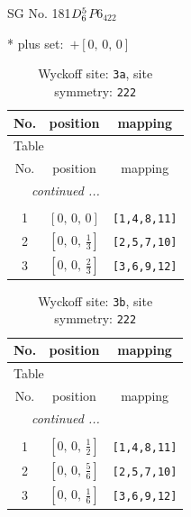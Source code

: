 \documentclass[fleqn,8pt]{jsarticle}
\begin{document}
\setcounter{MaxMatrixCols}{32}

\renewcommand{\tablename}{Table~}
\renewcommand{\figurename}{Figure~}
\begin{center}
\LARGE
SG No. 181\quad$D_{\rm 6}^{5}$\quad$P6_422$\quad[ hexagonal ]
\end{center}
* plus set:\,\,\,$+\left[ 0,\, 0,\, 0 \right]$
\renewcommand{\arraystretch}{1.2}
\begin{longtable}{ccc}
\caption{Wyckoff site: {\tt 3a}, site symmetry: {\tt 222}}
 \\
 \hline \hline
No. & position & mapping \\ \hline \endfirsthead

\multicolumn{2}{l}{\tablename\ \thetable{}} \\
 \hline \hline
No. & position & mapping \\ \hline \endhead

 \hline \hline
\multicolumn{2}{r}{\footnotesize\it continued ...} \\ \endfoot

 \hline \hline
\multicolumn{2}{r}{} \\ \endlastfoot

1 & $\left[ 0,\, 0,\, 0 \right]$ & {\tt [1,4,8,11]} \\ \hline
2 & $\left[ 0,\, 0,\, \frac{1}{3} \right]$ & {\tt [2,5,7,10]} \\ \hline
3 & $\left[ 0,\, 0,\, \frac{2}{3} \right]$ & {\tt [3,6,9,12]} \\
\end{longtable}
\renewcommand{\arraystretch}{1.2}
\begin{longtable}{ccc}
\caption{Wyckoff site: {\tt 3b}, site symmetry: {\tt 222}}
 \\
 \hline \hline
No. & position & mapping \\ \hline \endfirsthead

\multicolumn{2}{l}{\tablename\ \thetable{}} \\
 \hline \hline
No. & position & mapping \\ \hline \endhead

 \hline \hline
\multicolumn{2}{r}{\footnotesize\it continued ...} \\ \endfoot

 \hline \hline
\multicolumn{2}{r}{} \\ \endlastfoot

1 & $\left[ 0,\, 0,\, \frac{1}{2} \right]$ & {\tt [1,4,8,11]} \\ \hline
2 & $\left[ 0,\, 0,\, \frac{5}{6} \right]$ & {\tt [2,5,7,10]} \\ \hline
3 & $\left[ 0,\, 0,\, \frac{1}{6} \right]$ & {\tt [3,6,9,12]} \\
\end{longtable}
\end{document}
